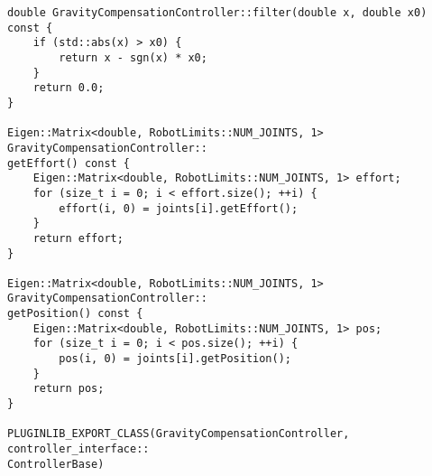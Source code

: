 \begin{lstlisting}
double GravityCompensationController::filter(double x, double x0) const {
    if (std::abs(x) > x0) {
        return x - sgn(x) * x0;
    }
    return 0.0;
}

Eigen::Matrix<double, RobotLimits::NUM_JOINTS, 1> GravityCompensationController::
getEffort() const {
    Eigen::Matrix<double, RobotLimits::NUM_JOINTS, 1> effort;
    for (size_t i = 0; i < effort.size(); ++i) {
        effort(i, 0) = joints[i].getEffort();
    }
    return effort;
}

Eigen::Matrix<double, RobotLimits::NUM_JOINTS, 1> GravityCompensationController::
getPosition() const {
    Eigen::Matrix<double, RobotLimits::NUM_JOINTS, 1> pos;
    for (size_t i = 0; i < pos.size(); ++i) {
        pos(i, 0) = joints[i].getPosition();
    }
    return pos;
}

PLUGINLIB_EXPORT_CLASS(GravityCompensationController, controller_interface::
ControllerBase)
\end{lstlisting}

